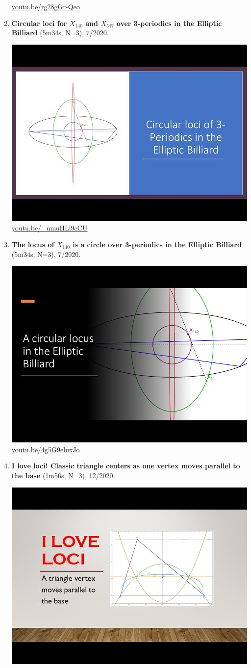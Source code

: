 \documentclass[12pt]{amsart}
\begin{document}
\begin{enumerate}[resume]
\begin{center}
\href{https://youtu.be/rg28gGr-Qeo}{\url{youtu.be/rg28gGr-Qeo}}\end{center}
% 
\item \textbf{Circular loci for $X_{140}$ and $X_{547}$ over 3-periodics in the Elliptic Billiard} (5m34s, N=3), 7/2020. 
\begin{center}\includegraphics[width=.5\textwidth]{pics/_umuHLl9cCU.jpg} \\ 
\href{https://youtu.be/_umuHLl9cCU}{\url{youtu.be/\_umuHLl9cCU}}\end{center}
% 
\item \textbf{The locus of $X_{140}$ is a circle over 3-periodics in the Elliptic Billiard} (5m34s, N=3), 7/2020. 
\begin{center}\includegraphics[width=.5\textwidth]{pics/4g5G9eluxJo.jpg} \\ 
\href{https://youtu.be/4g5G9eluxJo}{\url{youtu.be/4g5G9eluxJo}}\end{center}
% 
\item \textbf{I love loci! Classic triangle centers as one vertex moves parallel to the base} (1m56s, N=3), 12/2020. 
\begin{center}\includegraphics[width=.5\textwidth]{pics/Y50RFjhvsAo.jpg} \\ 

\end{center}
\end{enumerate}
\end{document}
